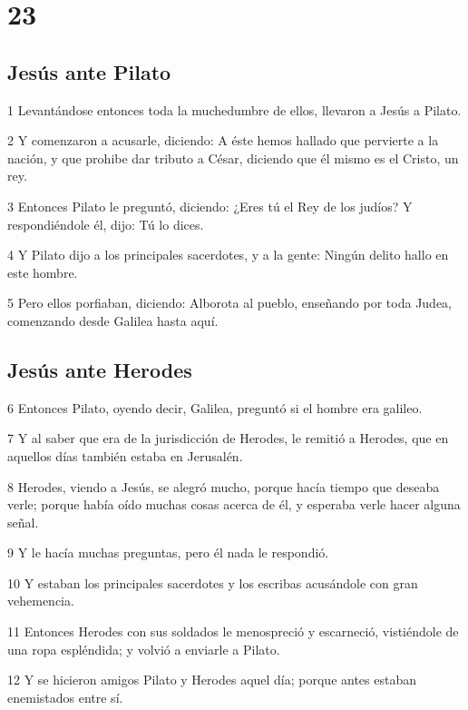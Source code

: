 \chapter{23}

\section*{Jesús ante Pilato}

\par 1 Levantándose entonces toda la muchedumbre de ellos, llevaron a Jesús a Pilato.
\par 2 Y comenzaron a acusarle, diciendo: A éste hemos hallado que pervierte a la nación, y que prohibe dar tributo a César, diciendo que él mismo es el Cristo, un rey.
\par 3 Entonces Pilato le preguntó, diciendo: ¿Eres tú el Rey de los judíos? Y respondiéndole él, dijo: Tú lo dices.
\par 4 Y Pilato dijo a los principales sacerdotes, y a la gente: Ningún delito hallo en este hombre.
\par 5 Pero ellos porfiaban, diciendo: Alborota al pueblo, enseñando por toda Judea, comenzando desde Galilea hasta aquí.

\section*{Jesús ante Herodes}

\par 6 Entonces Pilato, oyendo decir, Galilea, preguntó si el hombre era galileo.
\par 7 Y al saber que era de la jurisdicción de Herodes, le remitió a Herodes, que en aquellos días también estaba en Jerusalén.
\par 8 Herodes, viendo a Jesús, se alegró mucho, porque hacía tiempo que deseaba verle; porque había oído muchas cosas acerca de él, y esperaba verle hacer alguna señal.
\par 9 Y le hacía muchas preguntas, pero él nada le respondió.
\par 10 Y estaban los principales sacerdotes y los escribas acusándole con gran vehemencia.
\par 11 Entonces Herodes con sus soldados le menospreció y escarneció, vistiéndole de una ropa espléndida; y volvió a enviarle a Pilato.
\par 12 Y se hicieron amigos Pilato y Herodes aquel día; porque antes estaban enemistados entre sí.

